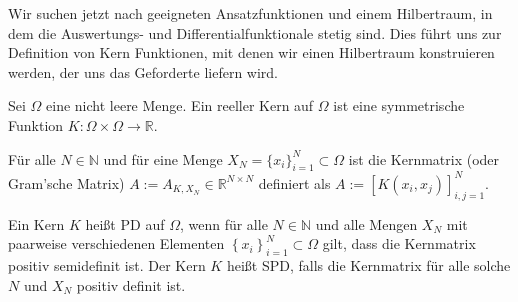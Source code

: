 Wir suchen jetzt nach geeigneten Ansatzfunktionen und einem Hilbertraum, in dem die Auswertungs- und Differentialfunktionale stetig sind. Dies führt uns zur Definition von Kern Funktionen, mit denen wir einen Hilbertraum konstruieren werden, der uns das Geforderte liefern wird.

\begin{definition}
\label{Kern}
Sei $\Omega$ eine nicht leere Menge. Ein reeller Kern auf $\Omega$ ist eine symmetrische Funktion $K: \Omega \times \Omega \rightarrow \mathbb{R}$.

Für alle $N \in \mathbb{N}$ und für eine Menge $X_N = \{x_i\}_{i=1}^N \subset \Omega$ ist die Kernmatrix (oder Gram'sche Matrix) $A:= A_{K,X_N} \in \mathbb{R}^{N \times N}$  definiert als $A:=[K(x_i, x_j)]_{i,j=1}^N$.

Ein Kern $K$ heißt \ac{PD} auf $\Omega$, wenn für alle $N \in \mathbb{N}$ und alle Mengen $X_N$ mit paarweise verschiedenen Elementen $\left\{x_i\right\}_{i=1}^N \subset \Omega$ gilt, dass die Kernmatrix positiv semidefinit ist. Der Kern $K$ heißt \ac{SPD}, falls die Kernmatrix für alle solche $N$ und $X_N$ positiv definit ist.
\end{definition}

